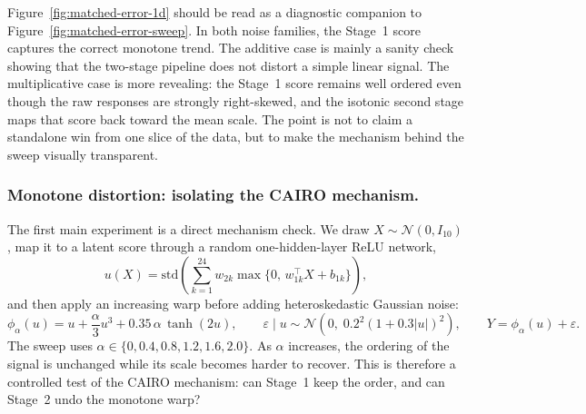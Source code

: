 Figure~\ref{fig:matched-error-1d} should be read as a diagnostic companion to Figure~\ref{fig:matched-error-sweep}. In both noise families, the Stage~1 score captures the correct monotone trend. The additive case is mainly a sanity check showing that the two-stage pipeline does not distort a simple linear signal. The multiplicative case is more revealing: the Stage~1 score remains well ordered even though the raw responses are strongly right-skewed, and the isotonic second stage maps that score back toward the mean scale. The point is not to claim a standalone win from one slice of the data, but to make the mechanism behind the sweep visually transparent.

\subsubsection{Monotone distortion: isolating the CAIRO mechanism.}
The first main experiment is a direct mechanism check. We draw \(X \sim \mathcal{N}(0,I_{10})\), map it to a latent score through a random one-hidden-layer ReLU network,
\[
u(X)=\mathrm{std}\!\left(\sum_{k=1}^{24} w_{2k}\max\{0,\,w_{1k}^\top X+b_{1k}\}\right),
\]
and then apply an increasing warp before adding heteroskedastic Gaussian noise:
\[
\phi_\alpha(u)=u+\frac{\alpha}{3}u^3+0.35\,\alpha\,\tanh(2u),
\qquad
\varepsilon \mid u \sim \mathcal{N}\!\left(0,\;0.2^2(1+0.3|u|)^2\right),
\qquad
Y=\phi_\alpha(u)+\varepsilon.
\]
The sweep uses \(\alpha \in \{0,0.4,0.8,1.2,1.6,2.0\}\). As \(\alpha\) increases, the ordering of the signal is unchanged while its scale becomes harder to recover. This is therefore a controlled test of the \textsc{CAIRO} mechanism: can Stage~1 keep the order, and can Stage~2 undo the monotone warp?

